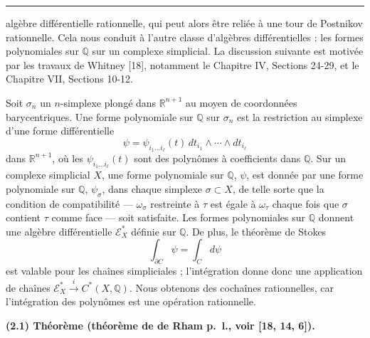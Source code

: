 \documentclass[
  french,
  a3paper,
  a3paper]{extarticle}
\begin{document}
\clearpage



\par

\vspace{0.7mm}\hrule\vspace{1.6mm}

\fontsize{9}{11}\selectfont

algèbre différentielle rationnelle, qui peut alors être reliée à une
tour de Postnikov rationnelle. Cela nous conduit à l'autre classe
d'algèbres différentielles : les formes polynomiales sur \(\mathbb Q\)
sur un complexe simplicial. La discussion suivante est motivée par les
travaux de Whitney {[}18{]}, notamment le Chapitre IV, Sections 24-29,
et le Chapitre VII, Sections 10-12.

Soit \(\sigma_n\) un \(n\)-simplexe plongé dans \(\mathbb R^{n+1}\) au
moyen de coordonnées barycentriques. Une forme polynomiale sur
\(\mathbb Q\) sur \(\sigma_n\) est la restriction au simplexe d'une
forme différentielle \[
\psi=\psi_{i_1\ldots i_\ell}(t)\,dt_{i_1}\wedge\cdots\wedge dt_{i_\ell}
\] dans \(\mathbb R^{n+1}\), où les \(\psi_{i_1\ldots i_\ell}(t)\) sont
des polynômes à coefficients dans \(\mathbb Q\). Sur un complexe
simplicial \(X\), une forme polynomiale sur \(\mathbb Q\), \(\psi\), est
donnée par une forme polynomiale sur \(\mathbb Q\), \(\psi_\sigma\),
dans chaque simplexe \(\sigma\subset X\), de telle sorte que la
condition de compatibilité --- \(\omega_\sigma\) restreinte à \(\tau\)
est égale à \(\omega_\tau\) chaque fois que \(\sigma\) contient \(\tau\)
comme face --- soit satisfaite. Les formes polynomiales sur
\(\mathbb Q\) donnent une algèbre différentielle \(\mathscr E_X^*\)
définie sur \(\mathbb Q\). De plus, le théorème de Stokes \[
\int_{\partial C}\psi=\int_Cd\psi
\] est valable pour les chaînes simpliciales ; l'intégration donne donc
une application de chaînes
\(\mathscr E_X^*\xrightarrow{i}C^*(X,\mathbb Q)\). Nous obtenons des
cochaînes rationnelles, car l'intégration des polynômes est une
opération rationnelle.

\textbf{(2.1) Théorème (théorème de de Rham p.~l., voir {[}18, 14,
6{]}).}
\end{document}
